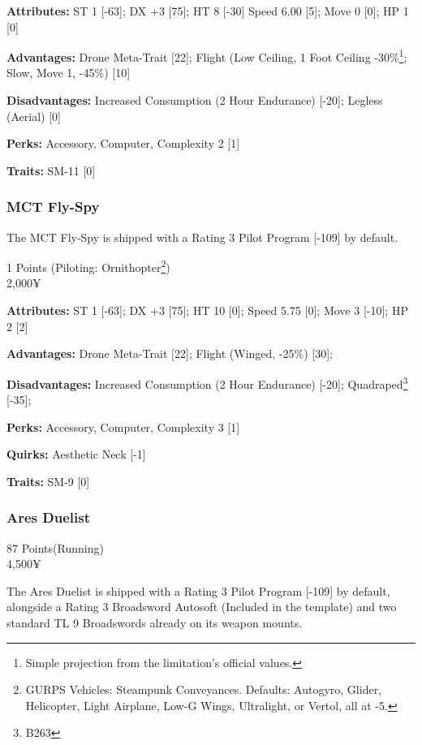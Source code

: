 \begin{multicols*}{2}
	\textbf{Attributes:} 
	ST 1 [-63]; DX +3 [75]; HT 8 [-30]
	Speed 6.00 [5]; Move 0 [0]; HP 1 [0]
	
	\textbf{Advantages:} 
	Drone Meta-Trait [22]; Flight (Low Ceiling, 1 Foot Ceiling -30\%\footnote{Simple projection from the limitation's official values.}; Slow, Move 1, -45\%) [10]

	\textbf{Disadvantages:} 
	Increased Consumption (2 Hour Endurance) [-20]; Legless (Aerial) [0]
	
	\textbf{Perks:}
	Accessory, Computer, Complexity 2 [1]
	
	\textbf{Traits:}
	SM-11 [0]	
	
	\subsubsection{MCT Fly-Spy}
	
	The MCT Fly-Spy is shipped with a Rating 3 Pilot Program [-109] by default.
	
	\begin{flushright}
		1 Points (Piloting: Ornithopter\footnote{GURPS Vehicles: Steampunk Conveyances. Defaults: Autogyro, Glider, Helicopter, Light Airplane, Low-G Wings, Ultralight, or Vertol, all at -5.})\\
		2,000¥
	\end{flushright}
	
	\textbf{Attributes:} 
	ST 1 [-63]; DX +3 [75]; HT 10 [0];
	Speed 5.75 [0]; Move 3 [-10]; HP 2 [2]
	
	\textbf{Advantages:} 
	Drone Meta-Trait [22]; Flight (Winged, -25\%) [30];
	
	\textbf{Disadvantages:} 
	Increased Consumption (2 Hour Endurance) [-20]; Quadraped\footnote{B263} [-35];
	
	\textbf{Perks:}
	Accessory, Computer, Complexity 3 [1]
	
	\textbf{Quirks:}
	Aesthetic Neck [-1]
	
	
	\textbf{Traits:}
	SM-9 [0]
	
	\subsubsection{Ares Duelist}
	\begin{flushright}
		87 Points(Running)\\
		4,500¥
	\end{flushright}

	The Ares Duelist is shipped with a Rating 3 Pilot Program [-109] by default, alongside a Rating 3 Broadsword Autosoft (Included in the template) and two standard TL 9 Broadswords already on its weapon mounts.


\end{multicols*}

